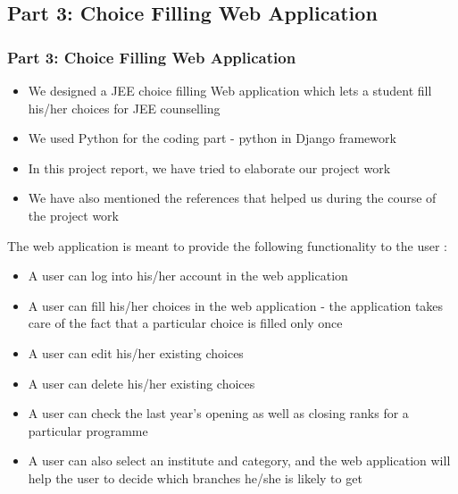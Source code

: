 \subsection{Part 3: Choice Filling Web Application}
\begin{frame}
	\frametitle{Part 3: Choice Filling Web Application}
	\begin{itemize}
		\item We designed a JEE choice filling Web application which lets a student fill his/her choices for JEE counselling \pause \\
		\item We used Python for the coding part - python in Django framework \cite{django_tutorial_1} \pause \\
		\item In this project report, we have tried to elaborate our project work \pause \\
		\item We have also mentioned the references that helped us during the course of the project work \cite{django_tutorial_2} \pause \\
	\end{itemize}
\end{frame}

\begin{frame}
	 The web application is meant to provide the following functionality to the user : \pause \\
	\begin{itemize}
	  \item A user can log into his/her account in the web application \pause \\
	  \item A user can fill his/her choices in the web application - the application takes care of the fact that a particular choice is filled only once \pause \\
	  \item A user can edit his/her existing choices \pause \\
	  \item A user can delete his/her existing choices \pause \\
	  \item A user can check the last year's opening as well as closing ranks for a particular programme \pause \\
	  \item A user can also select an institute and category, and the web application will help the user to decide which branches he/she is likely to get \pause \\
	\end{itemize}
\end{frame}
